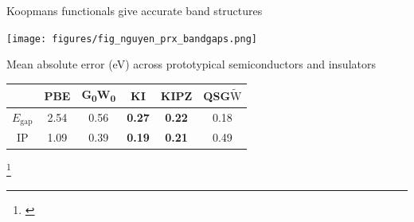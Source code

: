 \documentclass[xcolor=table,aspectratio=169]{beamer}
\newcommand\blfootcite[1]{%
  \begingroup
  \renewcommand\thefootnote{}\footnote{\hspace{-4ex}\cite{#1}}%
  \addtocounter{footnote}{-1}%
  \endgroup
}
\numberwithin{equation}{section}
\begin{document}
\begin{frame}{\normalsize Koopmans functionals give accurate band structures}
   \begin{minipage}[c]{0.35\textwidth}
      \texttt{[image: figures/fig\_nguyen\_prx\_bandgaps.png]}
   \end{minipage}
   \hspace{1em}
   \begin{minipage}[c]{0.6\textwidth}

      \footnotesize
      Mean absolute error (eV) across prototypical semiconductors and insulators

      \vspace{1ex}
      \begin{tabular}{c S[table-format = 2.2] S[table-format = 2.2] >{\color{marvelred}\bfseries}S[table-format = 2.2] >{\color{marvelred}\bfseries}S[table-format = 2.2] S[table-format = 2.2]}
                          & {PBE} & {G\textsubscript{0}W\textsubscript{0}} & {KI} & {KIPZ} & {QSG$\tilde{\mathrm{W}}$} \\
         \midrule
         \midrule
         $E_\mathrm{gap}$ & 2.54  & 0.56                                   & 0.27 & 0.22   & 0.18                      \\
         \midrule
         IP               & 1.09  & 0.39                                   & 0.19 & 0.21   & 0.49                      \\
      \end{tabular}
   \end{minipage}

   \blfootcite{Nguyen2018}
\end{frame}
\end{document}
